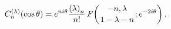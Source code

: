 \[\mathop{C^{(\lambda)}_{n}\/}\nolimits\!\left(\mathop{\cos\/}\nolimits\theta%
\right)=e^{ni\theta}\frac{\left(\lambda\right)_{n}}{n!}\mathop{F\/}\nolimits\!%
\left({-n,\lambda\atop 1-\lambda-n};e^{-2i\theta}\right).\]